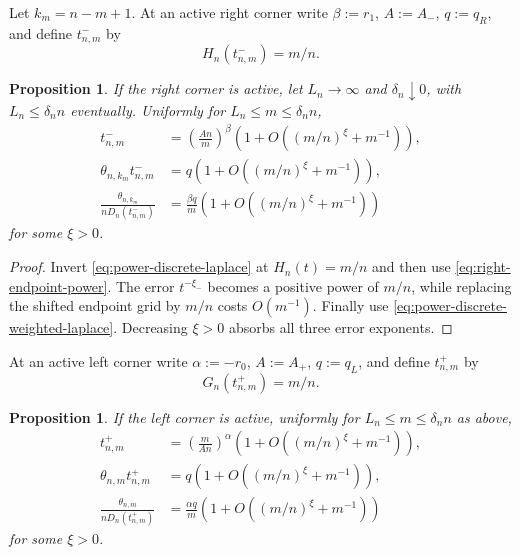 \documentclass[11pt]{article}
\newtheorem{proposition}[theorem]{Proposition}
\theoremstyle{remark}
\theoremstyle{plain}
\begin{document}
Let $k_m=n-m+1$.  At an active right corner write
$\beta:=r_1$, $A:=A_-$, $q:=q_R$, and define $t_{n,m}^-$ by
\begin{equation}\label{eq:tail-quantile}
 H_n(t_{n,m}^-)=m/n.
\end{equation}

\begin{proposition}
\label{prop:deterministic-slow}
If the right corner is active, let $L_n\to\infty$
and $\delta_n\downarrow0$, with $L_n\le\delta_n n$ eventually.  Uniformly for
$L_n\le m\le\delta_n n$,
\begin{align}
 t_{n,m}^-&=\left(\frac{An}{m}\right)^\beta
 \left(1+O((m/n)^{\xi}+m^{-1})\right),\label{eq:tm-power}\\
 \theta_{n,k_m}t_{n,m}^-&=q
 \left(1+O((m/n)^{\xi}+m^{-1})\right),\label{eq:theta-t-power}\\
 \frac{\theta_{n,k_m}}{nD_n(t_{n,m}^-)}
 &=\frac{\beta q}{m}
 \left(1+O((m/n)^{\xi}+m^{-1})\right)
 \label{eq:hazard-power}
\end{align}
for some $\xi>0$.
\end{proposition}

\begin{proof}
Invert \eqref{eq:power-discrete-laplace} at $H_n(t)=m/n$ and then use
\eqref{eq:right-endpoint-power}.  The error $t^{-\xi_-}$ becomes a positive
power of $m/n$, while replacing the shifted endpoint grid by $m/n$ costs
$O(m^{-1})$.  Finally use
\eqref{eq:power-discrete-weighted-laplace}.  Decreasing $\xi>0$ absorbs all
three error exponents.
\end{proof}

At an active left corner write $\alpha:=-r_0$, $A:=A_+$, $q:=q_L$,
and define $t_{n,m}^+$ by
\begin{equation}\label{eq:head-quantile}
 G_n(t_{n,m}^+)=m/n.
\end{equation}

\begin{proposition}
\label{prop:deterministic-early}
If the left corner is active, uniformly for
$L_n\le m\le\delta_n n$ as above,
\begin{align}
 t_{n,m}^+&=\left(\frac{m}{An}\right)^\alpha
 \left(1+O((m/n)^\xi+m^{-1})\right),
 \label{eq:early-time-power}\\
 \theta_{n,m}t_{n,m}^+&=q
 \left(1+O((m/n)^\xi+m^{-1})\right),
 \label{eq:early-theta-time}\\
 \frac{\theta_{n,m}}{nD_n(t_{n,m}^+)}
 &=\frac{\alpha q}{m}
 \left(1+O((m/n)^\xi+m^{-1})\right)
 \label{eq:early-hazard-power}
\end{align}
for some $\xi>0$.
\end{proposition}
\end{document}
